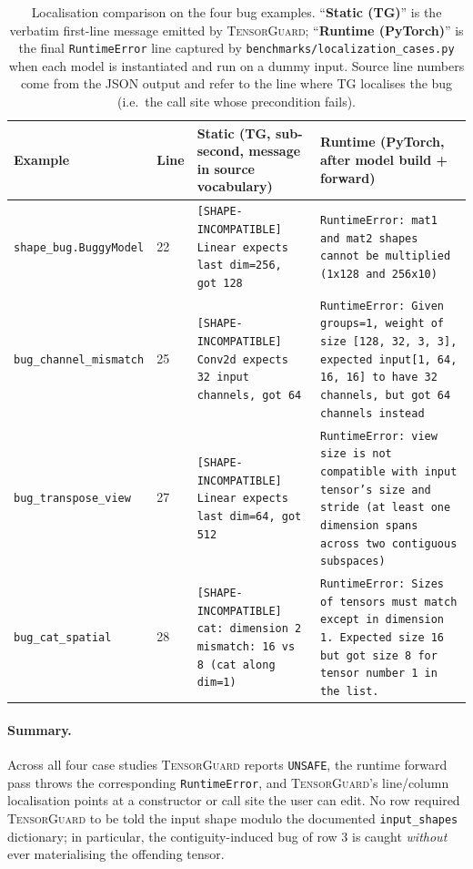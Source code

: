 \documentclass{article}
\theoremstyle{plain}
\theoremstyle{definition}
\newcommand{\TensorGuard}{\textsc{TensorGuard}}
\newcommand{\code}[1]{\texttt{\small #1}}
\begin{document}
\begin{table}[t]
\centering\small
\caption{Localisation comparison on the four bug examples.
``\textbf{Static (TG)}'' is the verbatim first-line message
emitted by \TensorGuard{}; ``\textbf{Runtime (PyTorch)}'' is the
final \code{RuntimeError} line captured by
\code{benchmarks/localization\_cases.py} when each model is
instantiated and run on a dummy input.  Source line numbers come
from the JSON output and refer to the line where TG localises the
bug (i.e.\ the call site whose precondition fails).}
\label{tab:localization}
\setlength\tabcolsep{4pt}
\begin{tabular}{p{2.0cm}p{0.5cm}p{6.4cm}p{6.4cm}}
\toprule
Example & Line & \textbf{Static (TG, sub-second, message in source vocabulary)} & \textbf{Runtime (PyTorch, after model build + forward)} \\
\midrule
\code{shape\_bug.BuggyModel}                & 22 & \scriptsize\code{[SHAPE-INCOMPATIBLE] Linear expects last dim=256, got 128}                  & \scriptsize\code{RuntimeError: mat1 and mat2 shapes cannot be multiplied (1x128 and 256x10)} \\[1pt]
\code{bug\_channel\_mismatch}               & 25 & \scriptsize\code{[SHAPE-INCOMPATIBLE] Conv2d expects 32 input channels, got 64}              & \scriptsize\code{RuntimeError: Given groups=1, weight of size [128, 32, 3, 3], expected input[1, 64, 16, 16] to have 32 channels, but got 64 channels instead} \\[1pt]
\code{bug\_transpose\_view}                 & 27 & \scriptsize\code{[SHAPE-INCOMPATIBLE] Linear expects last dim=64, got 512}                  & \scriptsize\code{RuntimeError: view size is not compatible with input tensor's size and stride (at least one dimension spans across two contiguous subspaces)} \\[1pt]
\code{bug\_cat\_spatial}                    & 28 & \scriptsize\code{[SHAPE-INCOMPATIBLE] cat: dimension 2 mismatch: 16 vs 8 (cat along dim=1)} & \scriptsize\code{RuntimeError: Sizes of tensors must match except in dimension 1. Expected size 16 but got size 8 for tensor number 1 in the list.} \\
\bottomrule
\end{tabular}
\end{table}

\paragraph{Summary.}
Across all four case studies \TensorGuard{} reports
\code{UNSAFE}, the runtime forward pass throws the corresponding
\code{RuntimeError}, and \TensorGuard{}'s line/column localisation
points at a constructor or call site the user can edit.  No row
required \TensorGuard{} to be told the input shape modulo the
documented \code{input\_shapes} dictionary; in particular, the
contiguity-induced bug of row 3 is caught \emph{without} ever
materialising the offending tensor.
\end{document}
